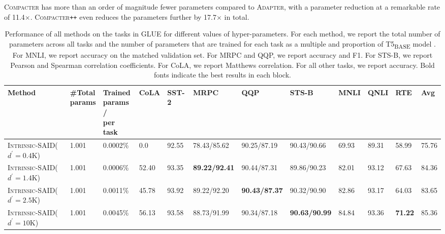 \documentclass{article}
\newcommand{\basebase}{T5\textsubscript{\tiny BASE}\xspace}
\newcommand{\adapter}{\textsc{Adapter}\xspace}
\newcommand{\compacter}{\textsc{Compacter}\xspace}
\newcommand{\compacteronlyff}{\textsc{Compacter}\texttt{++}\xspace} %
\newcommand{\intrinsic}{\textsc{Intrinsic-SAID}\xspace}
\begin{document}
\compacter has more than an order of magnitude fewer parameters compared to \adapter, with a parameter reduction at a remarkable rate of 11.4$\times$. \compacteronlyff even reduces the parameters further by 17.7$\times$ in total.

\begin{table}[tp]
\centering 
\caption{Performance of all methods on the tasks in GLUE for different values of hyper-parameters. For each method, we report the total number of parameters across all tasks and the number of parameters that are trained for each task as a multiple and proportion of \basebase model \citep{raffel2019exploring}. For MNLI, we report accuracy on the matched validation set. For MRPC and QQP, we report accuracy and F1. For STS-B, we report Pearson and Spearman correlation coefficients. For CoLA, we report Matthews correlation. For all other tasks, we report accuracy. Bold fonts indicate the best results in each block.}
\begin{adjustbox}{max width=\textwidth}
\begin{tabular}{l@{\hskip 0.02in}|l@{\hskip 0.05in}l@{\hskip 0.01in}|l@{\hskip 0.08in}l@{\hskip 0.08in}l@{\hskip 0.08in}l@{\hskip 0.08in}l@{\hskip 0.08in}l@{\hskip 0.08in}l@{\hskip 0.08in}l|l}
\toprule %
\textbf{Method} & \pbox{3cm}{\textbf{\#Total}\\ \textbf{params}} & \pbox{3cm}{\textbf{Trained} \\ \textbf{params /}\\ \textbf{per task\vspace{0.1em}}} & \textbf{CoLA} &    \textbf{SST-2} &   \textbf{MRPC} &   \textbf{QQP} &     \textbf{STS-B} & \textbf{MNLI}  &    \textbf{QNLI} & \textbf{RTE} &   \textbf{Avg} \\
\toprule 
\intrinsic ($d^{\prime}=0.4$K) &1.001 & 0.0002\%&  0.0 &  92.55 &  78.43/85.62 &  90.25/87.19 &  90.43/90.66 &  69.93 &  89.31 &  58.99 &  75.76 \\
\intrinsic ($d^{\prime}=1.4$K) &1.001 &  0.0006\% &52.40 &  93.35 &  \textbf{89.22/92.41} &  90.44/87.31 &  89.86/90.23 &  82.01 &  93.12 &  67.63 &  84.36 \\
\intrinsic ($d^{\prime}=2.5$K) &1.001 & 0.0011\%& 45.78 &  93.92 &   89.22/92.20 &  \textbf{90.43/87.37} &   90.32/90.90 &  82.86 &  93.17 &  64.03 &  83.65 \\
\intrinsic ($d^{\prime}=10$K) &1.001 & 0.0045\%& 56.13 &  93.58 &  88.73/91.99 &  90.34/87.18 &  \textbf{90.63/90.99} &  84.84 &  93.36 &  \textbf{71.22} &  85.36 \\

\end{tabular}
\end{adjustbox}
\end{table}
\end{document}
